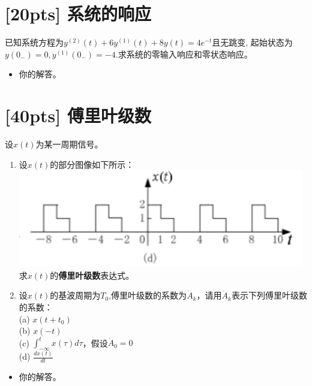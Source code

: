 \documentclass[a4paper,UTF8]{article}
\numberwithin{equation}{section}
\begin{document}
\newpage
\section{[20pts] 系统的响应 }
已知系统方程为$y^{(2)}(t)+6y^{(1)}(t)+8y(t)=4e^{-t}$且无跳变, 起始状态为$y(0_{-})=0,y^{(1)}(0_{-})=-4$.求系统的零输入响应和零状态响应。

\begin{framed}
    \begin{spacing}{1.5}
        \begin{itemize}
            \item 你的解答。
        \end{itemize}
    \end{spacing}
\end{framed}

\newpage
\section{[40pts] 傅里叶级数}
设$x(t)$为某一周期信号。
\begin{enumerate}[(1)]
	\item 设$x(t)$的部分图像如下所示：\\
	\includegraphics[scale=0.4]{1.png}\\
	求$x(t)$的\textbf{傅里叶级数}表达式。
	\item 设$x(t)$的基波周期为$T_0$,傅里叶级数的系数为$\dot{A}_k$，请用$\dot{A}_k$表示下列傅里叶级数的系数：\\
	(a) $x(t+t_0)$\\
	(b) $x(-t)$\\
	(c) $\displaystyle\int_{-\infty}^tx(\tau)d\tau$，假设$\dot{A}_0=0$\\
	(d) $\displaystyle\frac{dx(t)}{dt}$
\end{enumerate}

\begin{framed}
\begin{spacing}{1.5}
    \begin{itemize}
    \item 你的解答。
    \end{itemize}
\end{spacing}
\end{framed}


\newpage
\end{document}
